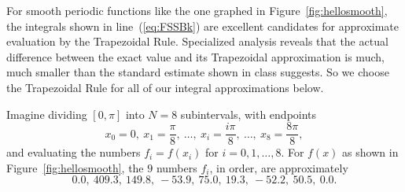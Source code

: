 \documentclass{exam}
\newcommand\starscore[2]{%
  \pgfmathsetmacro\pgfxa{#1 + 1}%
  \tikzstyle{scorestars}=[star, star points=5, star point ratio=2.5, draw, inner sep=0.12em, anchor=outer point 3]%
  \begin{tikzpicture}[baseline=2pt]
    \foreach \i in {1, ..., #2} {
      \pgfmathparse{\i<=#1 ? "black" : "white"}
      \edef\starcolor{\pgfmathresult}
      \draw (\i*1em, 0) node[name=star\i, scorestars, fill=\starcolor, semithick]  {};
    }
    \pgfmathparse{#1>int(#1) ? int(#1+1) : 0}
    \let\partstar=\pgfmathresult
    \ifnum\partstar>0
      \pgfmathsetmacro\starpart{#1-(int(#1)}
      \path [clip] ($(star\partstar.outer point 3)!(star\partstar.outer point 2)!(star\partstar.outer point 4)$) rectangle 
      ($(star\partstar.outer point 2 |- star\partstar.outer point 1)!\starpart!(star\partstar.outer point 1 -| star\partstar.outer point 5)$);
      \fill (\partstar*1em, 0) node[scorestars, fill=black]  {};
    \fi
  \end{tikzpicture}%
}
\begin{document}
\begin{questions}
\begin{parts}
\begin{solution}
\end{solution}

\end{parts}



\begin{EnvUplevel}
For smooth periodic functions like the one graphed in Figure~\ref{fig:hellosmooth},
the integrals shown in line~(\ref{eq:FSSBk}) are excellent candidates 
for approximate evaluation by the Trapezoidal Rule.
Specialized analysis reveals that the actual difference 
between the exact value  and its Trapezoidal approximation is much,
much smaller than the standard estimate shown in class suggests.
So we choose the Trapezoidal Rule for all of our integral approximations below.
\end{EnvUplevel}

\question
Imagine dividing $[0,\pi]$ into $N=8$ subintervals, with endpoints 
\[
x_0 = 0,\ x_1=\frac{\pi}8,\ \ldots,\ x_i = \frac{i\pi}{8},\ \ldots,\ x_8 = \frac{8\pi}8,
\]
and evaluating the numbers $f_i = f(x_i)$ for $i=0,1,\ldots,8$.
For $f(x)$ as shown in Figure~\ref{fig:hellosmooth}, the  $9$ numbers $f_i$, in order, are approximately
\[
0.0,\ 
409.3,\ 
149.8,\ 
-53.9,\ 
75.0,\ 
19.3,\ 
-52.2,\ 
50.5,\ 
0.0.
\]
\end{questions}
\end{document}
